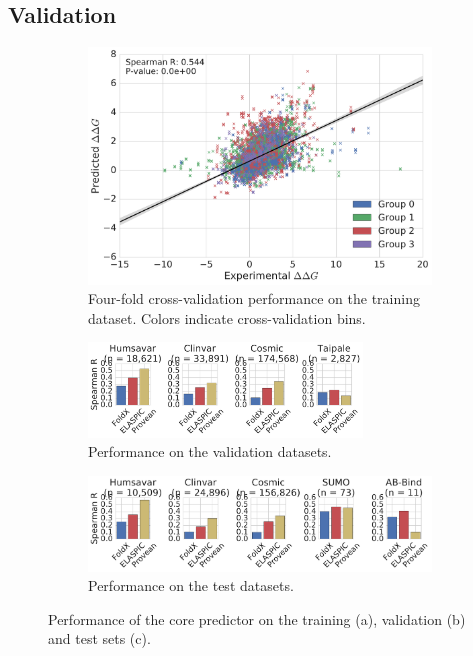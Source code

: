 \subsection{Validation}

\begin{figure}[ht]

	\begin{subfigure}[b]{1.0\textwidth}
		\centering
		\includegraphics[width=0.6\linewidth]{static/elaspic_training_set/validation/crossvalidation_performance_core.pdf}
		\caption{Four-fold cross-validation performance on the training dataset. Colors indicate cross-validation bins.}
		\vspace*{10mm}
	\end{subfigure}

	\begin{subfigure}[b]{1.0\textwidth}
		\centering
		\includegraphics[width=0.8\textwidth]{static/elaspic_training_set/validation/validation_performance_core.pdf}
		\caption{Performance on the validation datasets.}
		\vspace*{10mm}
	\end{subfigure}

	\begin{subfigure}[b]{1.0\textwidth}
		\centering
		\includegraphics[width=1.0\textwidth]{static/elaspic_training_set/validation/test_performance_core.pdf}
		\caption{Performance on the test datasets.}
	\end{subfigure}

	\caption[Core predictor validation.]{Performance of the core predictor on the training (a), validation (b) and test sets (c).}
\end{figure}




